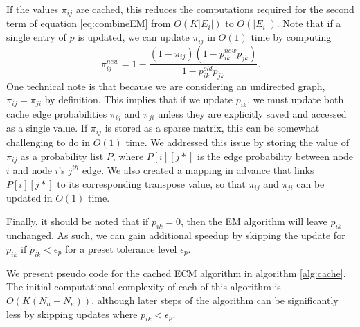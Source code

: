 \documentclass[11pt]{amsart}
\begin{document}
If the values $\pi_{ij}$ are cached, this reduces the computations required for the second term of
equation \ref{eq:combineEM} from $O(K | E_i |)$ to $O( | E_i | )$.
Note that if a single entry of $p$ is updated, we can update $\pi_{ij}$ in $O(1)$ time by computing 
\begin{equation}
\pi^{new}_{ij} = 1 - \frac{ (1 - \pi_{ij} )( 1 - p^{new}_{ik} p_{jk} ) } { 1 - p^{old}_{ik} p_{jk} }. 
\end{equation}
One technical note is that because we are considering an undirected graph, $\pi_{ij} = \pi_{ji}$ by definition. 
This implies that if we update $p_{ik}$, we must update both cache edge probabilities $\pi_{ij}$ and $\pi_{ji}$
unless they are explicitly saved and accessed as a single value. If $\pi_{ij}$ is stored as a sparse matrix, 
this can be somewhat challenging to do in $O(1)$ time. 
 We addressed this issue by storing the 
value of $\pi_{ij}$ as a probability list $P$, where $P[i][j*]$ is the edge probability between node $i$ and node $i$'s 
$j^{th}$ edge. We also created a mapping in advance that links $P[i][j*]$ to its corresponding transpose value, 
so that $\pi_{ij}$ and $\pi_{ji}$ can be updated in $O(1)$ time. 

Finally, it should be noted that if $p_{ik} = 0$, then the EM algorithm will leave $p_{ik}$ unchanged. 
As such, we can gain additional speedup by skipping the update for $p_{ik}$ if $p_{ik} < \epsilon_p$
for a preset tolerance level $\epsilon_p$. 

We present pseudo code for the cached ECM algorithm in algorithm \ref{alg:cache}. 
The initial computational complexity of each of this algorithm is $O(K(N_n+N_e ) )$, 
although later steps of the algorithm can be significantly less by skipping updates where $p_{ik} < \epsilon_p$. 
\end{document}
